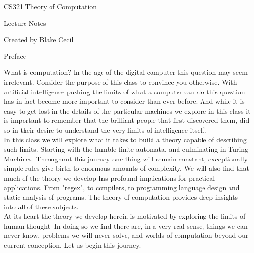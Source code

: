 \documentclass[11pt]{exam}
\begin{document}
 

\vspace*{20mm}
 
\begin{center}
\Huge{CS321 Theory of Computation}\\

\vspace{10mm}

\Huge{Lecture Notes}\\

\vspace{10mm}

\large{Created by Blake Cecil}\\

\end{center}



\newpage 

\begin{center}
\huge Preface
\vspace{5mm}
\end{center}
\normalsize{
What is computation? In the age of the digital computer this question may seem irrelevant. Consider the purpose of this class to convince you otherwise. With artificial intelligence pushing the limits of what a computer can do this question has in fact become more important to consider than ever before. And while it is easy to get lost in the details of the particular machines we explore in this class it is important to remember that the brilliant people that first discovered them, did so in their desire to understand the very limits of intelligence itself.\\

In this class we will explore what it takes to build a theory capable of describing such limits. Starting with the humble finite automata, and culminating in Turing Machines. Throughout this journey one thing will remain constant, exceptionally simple rules give birth to enormous amounts of complexity. We will also find that much of the theory we develop has profound implications for practical applications. From "regex", to compilers, to programming language design and static analysis of programs. The theory of computation provides deep insights into all of these subjects.\\

At its heart the theory we develop herein is motivated by exploring the limits of human thought. In doing so we find there are, in a very real sense, things we can never know, problems we will never solve, and worlds of computation beyond our current conception. Let us begin this journey.}
\end{document}
